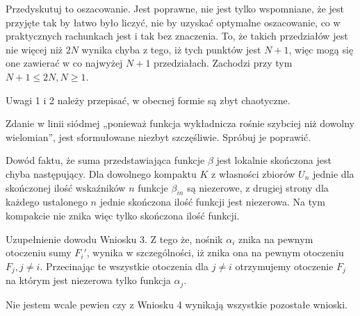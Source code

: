 \documentclass[a4paper,11pt]{article}
\numberwithin{equation}{section}
\begin{document}
\noindent
{} Przedyskutuj to oszacowanie. Jest poprawne, nie jest
tylko wspomniane, że jest przyjęte tak by łatwo było liczyć, nie by
uzyskać optymalne oszacowanie, co w praktycznych rachunkach jest i tak
bez znaczenia. To, że takich przedziałów jest nie więcej niż $2N$
wynika chyba z tego, iż tych punktów jest $N + 1$, więc mogą się one
zawierać w co najwyżej $N + 1$ przedziałach. Zachodzi przy tym
$N + 1 \leq 2 N, N \geq 1$.

\VerSpaceFour





\noindent
{} Uwagi 1 i 2 należy przepisać, w obecnej formie są
zbyt chaotyczne.

\VerSpaceFour





\noindent
{} Zdanie w linii siódmej „ponieważ funkcja wykładnicza
rośnie szybciej niż dowolny wielomian”, jest sformułowane niezbyt
szczęśliwie. Spróbuj je poprawić.

\VerSpaceFour





\noindent
{} Dowód faktu, że suma przedstawiająca funkcje $\beta$
jest lokalnie skończona jest chyba następujący. Dla dowolnego kompaktu
$K$ z własności zbiorów $U_{ n }$ jednie dla skończonej ilość
wskaźników $n$ funkcje $\beta_{ i n }$ są niezerowe, z drugiej strony
dla każdego ustalonego $n$ jednie skończona ilość funkcji jest
niezerowa. Na tym kompakcie nie znika więc tylko skończona ilość
funkcji.

\VerSpaceFour





\noindent
{} Uzupełnienie dowodu Wniosku 3. Z tego że, nośnik
$\alpha_{ i }$ znika na pewnym otoczeniu sumy $F_{ i }'$, wynika w
szczególności, iż znika ona na pewnym otoczeniu $F_{ j }, j \neq i$.
Przecinając te wszystkie otoczenia dla $j \neq i$ otrzymujemy
otoczenie $F_{ j }$ na którym jest niezerowa tylko funkcja
$\alpha_{ j }$.

\VerSpaceFour





\noindent
{} Nie jestem wcale pewien czy z Wniosku 4 wynikają
wszystkie pozostałe wnioski.

\VerSpaceFour
\end{document}
